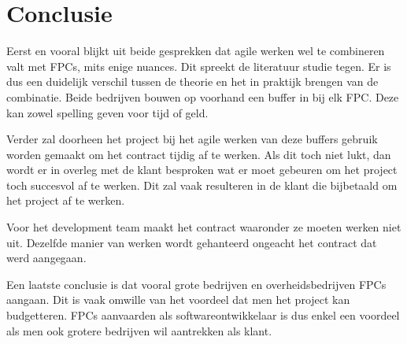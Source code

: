 \documentclass{hogent-article}
\begin{document}
	
	\section{Conclusie}
	Eerst en vooral blijkt uit beide gesprekken dat agile werken wel te combineren valt met FPCs, mits enige nuances. Dit spreekt de literatuur studie tegen. Er is dus een duidelijk verschil tussen de theorie en het in praktijk brengen van de combinatie. Beide bedrijven bouwen op voorhand een buffer in bij elk FPC. Deze kan zowel spelling geven voor tijd of geld.
	
	Verder zal doorheen het project bij het agile werken van deze buffers gebruik worden gemaakt om het contract tijdig af te werken. Als dit toch niet lukt, dan wordt er in overleg met de klant besproken wat er moet gebeuren om het project toch succesvol af te werken. Dit zal vaak resulteren in de  klant die bijbetaald om het project af te werken.
	
	Voor het development team maakt het contract waaronder ze moeten werken niet uit. Dezelfde manier van werken wordt gehanteerd ongeacht het contract dat werd aangegaan.
	
	Een laatste conclusie is dat vooral grote bedrijven en overheidsbedrijven FPCs aangaan. Dit is vaak omwille van het voordeel dat men het project kan budgetteren. FPCs aanvaarden als softwareontwikkelaar is dus enkel een voordeel als men ook grotere bedrijven wil aantrekken als klant.
	
	\printbibliography[heading=bibintoc]
	
\end{document}
